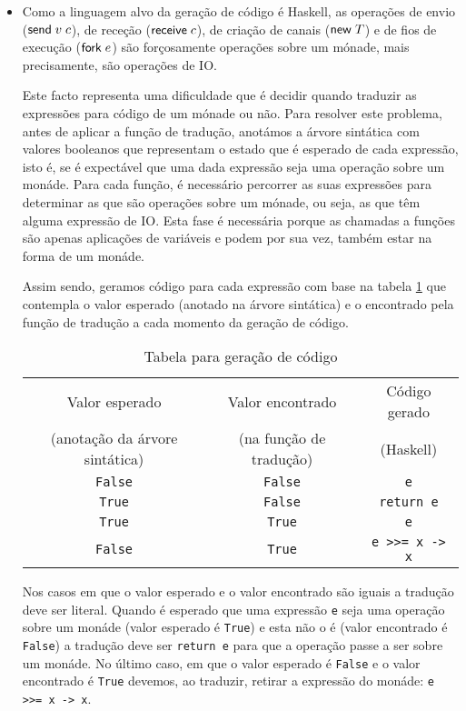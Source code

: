 \begin{itemize}
\item Como a linguagem alvo da geração de código é Haskell, as operações de envio ($\mathsf{send}\;v\; c$), de receção ($\mathsf{receive}\;c$), de criação de canais ($\mathsf{new}\;T$) e de fios de execução ($\mathsf{fork}\;e$) são forçosamente operações sobre um mónade, mais precisamente, são operações de IO.

Este facto representa uma dificuldade que é decidir quando traduzir as expressões para código de um mónade ou não. 
Para resolver este problema, antes de aplicar a função de tradução, anotámos a árvore sintática com valores booleanos que representam o estado que é esperado de cada expressão, isto é, se é expectável que uma dada expressão seja uma operação sobre um monáde.
Para cada função, é necessário percorrer as suas expressões para determinar as que são operações sobre um mónade, ou seja, as que têm alguma expressão de IO. Esta fase é necessária porque as chamadas a funções são apenas aplicações de variáveis e podem por sua vez, também estar na forma de um monáde.

Assim sendo, geramos código para cada expressão com base na tabela \ref{tab:monad} que contempla o valor esperado (anotado na árvore sintática) e o encontrado pela função de tradução a cada momento da geração de código.

\begin{table}
\begin{center}
  \begin{tabular}[ht!]{| c | c | c |}
    \hline  
    \quad Valor esperado \quad&\quad Valor encontrado \quad&\quad Código gerado \quad\\
    \quad (anotação da árvore sintática) \quad&\quad (na função de tradução) \quad& (Haskell) \quad\\\hline
    \lstinline|False| & \lstinline|False| & \lstinline|e| \\
    \lstinline|True| & \lstinline|False| & \lstinline|return e| \\
    \lstinline|True| & \lstinline|True| & \lstinline|e| \\
    \lstinline|False| & \lstinline|True| & \lstinline|e >>= x -> x| \\
    \hline
  \end{tabular}
  \vspace{0.2cm}
  \caption{Tabela para geração de código}
  \label{tab:monad}
\end{center}
\end{table}

Nos casos em que o valor esperado e o valor encontrado são iguais a tradução deve ser literal. Quando é esperado que uma expressão \lstinline|e| seja uma operação sobre um monáde (valor esperado é \lstinline|True|) e esta não o é (valor encontrado é \lstinline|False|) a tradução deve ser \lstinline"return e" para que a operação passe a ser sobre um monáde. No último caso, em que o valor esperado é \lstinline|False| e o valor encontrado é \lstinline|True| devemos, ao traduzir, retirar a expressão do monáde: \lstinline"e >>= x -> x".


\end{itemize}
